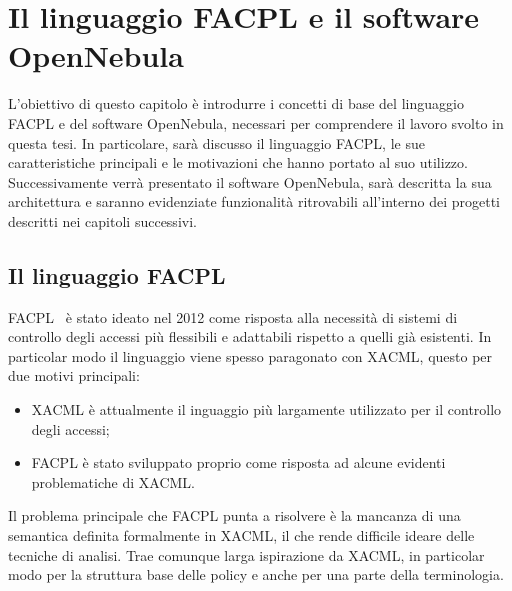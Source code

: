 \chapter{Il linguaggio FACPL e il software OpenNebula}
\label{cap:capitolo2}
L'obiettivo di questo capitolo è introdurre i concetti di base del linguaggio FACPL e del software OpenNebula, necessari per comprendere il lavoro svolto in questa tesi. In particolare, sarà discusso il linguaggio FACPL, le sue caratteristiche principali e le motivazioni che hanno portato al suo utilizzo. Successivamente verrà presentato il software OpenNebula, sarà descritta la sua architettura e saranno evidenziate funzionalità ritrovabili all'interno dei progetti descritti nei capitoli successivi.\par
\section{Il linguaggio FACPL}
FACPL~\cite{FAPCLTesi} è stato ideato nel 2012 come risposta alla necessità di sistemi di controllo degli accessi più flessibili e adattabili rispetto a quelli già esistenti. In particolar modo il linguaggio viene spesso paragonato con XACML, questo per due motivi principali: 
\begin{itemize}
    \item XACML è attualmente il inguaggio più largamente utilizzato per il controllo degli accessi;
    \item FACPL è stato sviluppato proprio come risposta ad alcune evidenti problematiche di XACML.
\end{itemize}
Il problema principale che FACPL punta a risolvere è la mancanza di una semantica definita formalmente in XACML, il che rende difficile ideare delle tecniche di analisi. Trae comunque larga ispirazione da XACML, in particolar modo per la struttura base delle policy e anche per una parte della terminologia.\par

